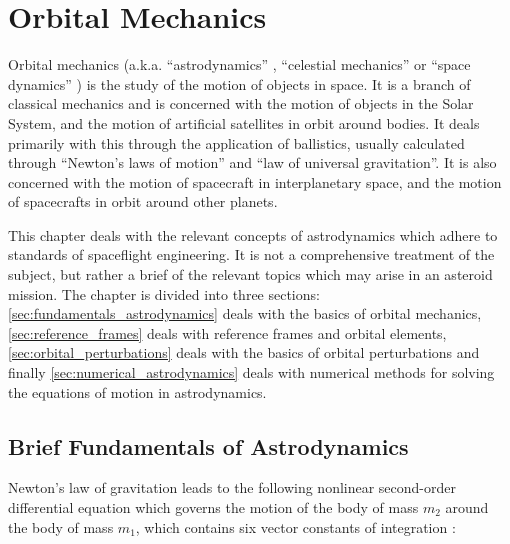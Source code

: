 \chapter{Orbital Mechanics}

Orbital mechanics \cite{Curtis2014} (a.k.a. ``astrodynamics'' \cite{Wakker2015}, ``celestial mechanics'' \cite{fitzpatrick_2012} or ``space dynamics'' \cite{thomson1986introduction}) is the study of the motion of objects in space. It is a branch of classical mechanics and is concerned with the motion of objects in the Solar System, and the motion of artificial satellites in orbit around bodies. It deals primarily with this through the application of ballistics, usually calculated through ``Newton's laws of motion'' and ``law of universal gravitation''. It is also concerned with the motion of spacecraft in interplanetary space, and the motion of spacecrafts in orbit around other planets.

This chapter deals with the relevant concepts of astrodynamics which adhere to standards of spaceflight engineering. It is not a comprehensive treatment of the subject, but rather a brief of the relevant topics which may arise in an asteroid mission. The chapter is divided into three sections: \autoref{sec:fundamentals_astrodynamics} deals with the basics of orbital mechanics, \autoref{sec:reference_frames} deals with reference frames and orbital elements, \autoref{sec:orbital_perturbations} deals with the basics of orbital perturbations and finally \autoref{sec:numerical_astrodynamics} deals with numerical methods for solving the equations of motion in astrodynamics.

\section{Brief Fundamentals of Astrodynamics}\label{sec:fundamentals_astrodynamics}

Newton's law of gravitation leads to the following nonlinear second-order differential equation which governs the motion of the body of mass $m_2$ around the body of mass $m_1$, which contains six vector constants of integration \cite[p.~67]{Curtis2014}:

